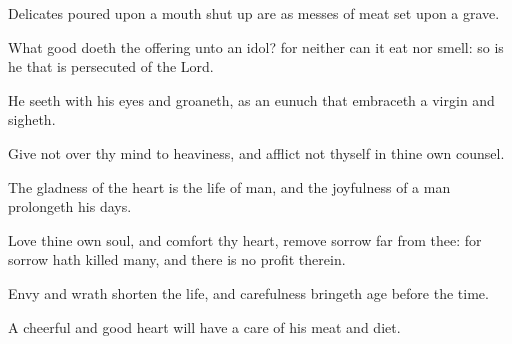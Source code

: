 {\par }{\PP {}Delicates poured upon a mouth shut up are as messes of meat set upon a grave.
\par }{\PP {}What good doeth the offering unto an idol? for neither can it eat nor smell: so is he that is persecuted of the Lord.
\par }{\PP {}He seeth with his eyes and groaneth, as an eunuch that embraceth a virgin and sigheth.
\par }{\PP {}Give not over thy mind to heaviness, and afflict not thyself in thine own counsel.
\par }{\PP {}The gladness of the heart is the life of man, and the joyfulness of a man prolongeth his days.
\par }{\PP {}Love thine own soul, and comfort thy heart, remove sorrow far from thee: for sorrow hath killed many, and there is no profit therein.
\par }{\PP {}Envy and wrath shorten the life, and carefulness bringeth age before the time.
\par }{\PP {}A cheerful and good heart will have a care of his meat and diet.

}
